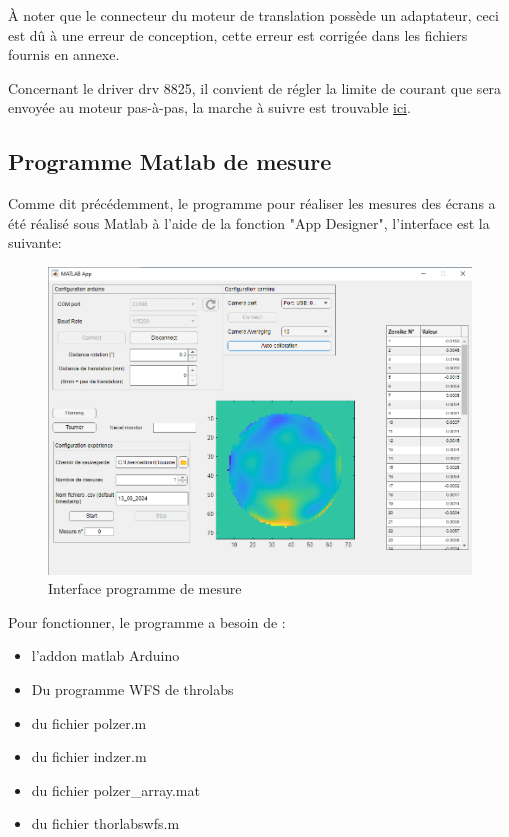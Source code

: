 À noter que le connecteur du moteur de translation possède un adaptateur, ceci est dû à une erreur de conception, cette erreur est corrigée
dans les fichiers fournis en annexe.

Concernant le driver drv 8825, il convient de régler la limite de courant que sera envoyée au moteur pas-à-pas, la marche à suivre est trouvable \href{https://www.pololu.com/product/2133}{ici}.\footnotemark


\subsection{Programme Matlab de mesure}
Comme dit précédemment, le programme pour réaliser les mesures des écrans a été réalisé sous Matlab à l'aide de la fonction "App Designer", l'interface est la suivante:
\begin{figure}[H]
    \centering
    \includegraphics[width = \textwidth]{assets/figures/ameliorations/capture interface.png}
    \caption{Interface programme de mesure}
\end{figure}
Pour fonctionner, le programme a besoin de :
\begin{itemize}
    \item l'addon matlab Arduino
    \item Du programme WFS de throlabs \cite{WFS_thorlabs_site}
    \item du fichier polzer.m
    \item du fichier indzer.m
    \item du fichier polzer\_array.mat
    \item du fichier thorlabswfs.m
\end{itemize}

